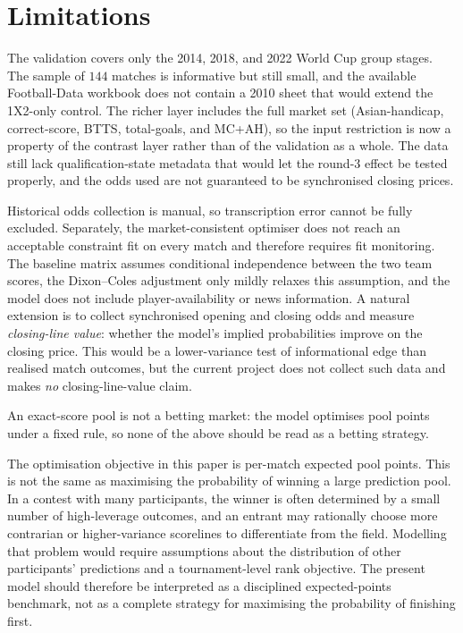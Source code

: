 \documentclass[11pt]{article}
\begin{document}
\section{Limitations}

The validation covers only the 2014, 2018, and 2022 World Cup group stages. The sample of
\(144\) matches is informative but still small, and the available Football-Data workbook does not contain a 2010 sheet that would extend the 1X2-only control. The richer layer includes the full market set (Asian-handicap, correct-score, BTTS, total-goals, and MC+AH), so the input restriction is now a property of the contrast layer rather than of the validation as a whole. The data still lack qualification-state metadata that would let the round-3 effect be tested properly, and the odds used are not guaranteed to be synchronised closing prices.

Historical odds collection is manual, so transcription error cannot be fully excluded. Separately, the market-consistent optimiser does not reach an acceptable constraint fit on every match and therefore requires fit monitoring. The baseline matrix assumes conditional independence between the two team scores, the Dixon--Coles adjustment only mildly relaxes this assumption, and the model does not include player-availability or news information. A natural extension is to collect synchronised opening and closing odds and measure \emph{closing-line value}: whether the model's implied probabilities improve on the closing price. This would be a lower-variance test of informational edge than realised match outcomes, but the current project does not collect such data and makes \emph{no} closing-line-value claim.

An exact-score pool is not a betting market: the model optimises pool points under a fixed
rule, so none of the above should be read as a betting strategy.

The optimisation objective in this paper is per-match expected pool points. This is not the same 
as maximising the probability of winning a large prediction pool. In a contest with many participants, 
the winner is often determined by a small number of high-leverage outcomes, and an entrant may rationally 
choose more contrarian or higher-variance scorelines to differentiate from the field. Modelling that problem 
would require assumptions about the distribution of other participants' predictions and a tournament-level 
rank objective. The present model should therefore be interpreted as a disciplined expected-points benchmark, 
not as a complete strategy for maximising the probability of finishing first.
\end{document}
